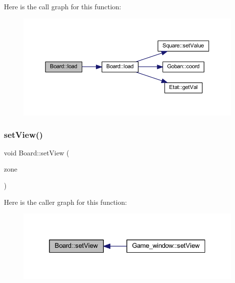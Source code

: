 Here is the call graph for this function\+:\nopagebreak
\begin{figure}[H]
\begin{center}
\leavevmode
\includegraphics[width=350pt]{class_board_a3cea4df16e41c21666cf51789b7e9e78_cgraph}
\end{center}
\end{figure}
\mbox{\label{class_board_afb8c7e3266134506f024b29e08fef695}} 
\subsubsection{\texorpdfstring{set\+View()}{setView()}}
{\footnotesize\ttfamily void Board\+::set\+View (\begin{DoxyParamCaption}\item[{const sf\+::\+Float\+Rect \&}]{zone }\end{DoxyParamCaption})}

Here is the caller graph for this function\+:\nopagebreak
\begin{figure}[H]
\begin{center}
\leavevmode
\includegraphics[width=319pt]{class_board_afb8c7e3266134506f024b29e08fef695_icgraph}
\end{center}
\end{figure}
\mbox{\label{class_board_a0b098808fd9214c752097a623a7c717e}} 

